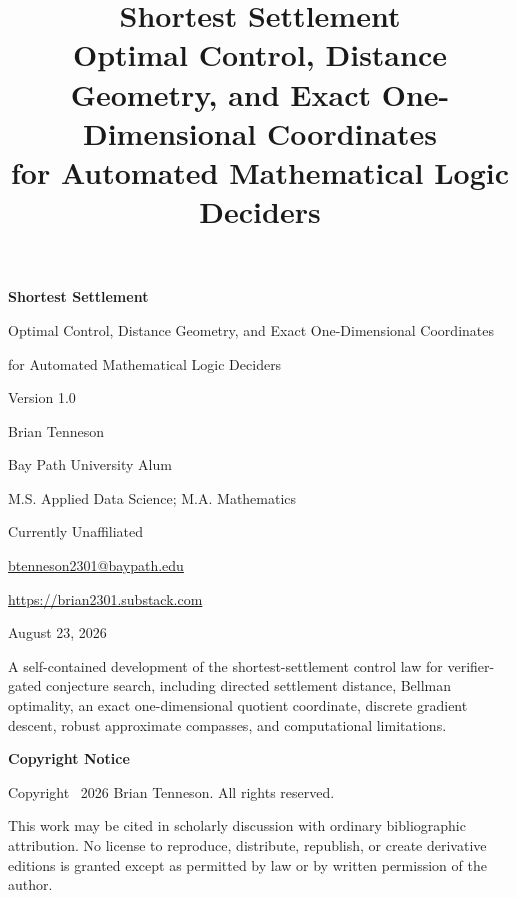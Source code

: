 \documentclass[11pt,letterpaper]{article}
\title{\bfseries Shortest Settlement\\[0.35em]
\Large Optimal Control, Distance Geometry, and Exact One-Dimensional Coordinates\\
for Automated Mathematical Logic Deciders}
\author{}
\date{}
\theoremstyle{remark}
\begin{document}
\begin{titlepage}
\thispagestyle{empty}
\centering
\vspace*{0.85in}
{\LARGE\bfseries Shortest Settlement\par}
\vspace{0.25in}
{\Large Optimal Control, Distance Geometry, and Exact One-Dimensional Coordinates\par}
{\Large for Automated Mathematical Logic Deciders\par}
\vspace{0.55in}
{\large Version 1.0\par}
\vspace{0.45in}
{\Large Brian Tenneson\par}
\vspace{0.12in}
{\normalsize Bay Path University Alum\par}
{\normalsize M.S. Applied Data Science; M.A. Mathematics\par}
{\normalsize Currently Unaffiliated\par}
\vspace{0.14in}
{\normalsize\href{mailto:btenneson2301@baypath.edu}{btenneson2301@baypath.edu}\par}
{\normalsize\url{https://brian2301.substack.com}\par}
\vfill
{\large August 23, 2026\par}
\vspace{0.25in}
\begin{minipage}{0.82\textwidth}
\small
\centering
A self-contained development of the shortest-settlement control law for verifier-gated conjecture search, including directed settlement distance, Bellman optimality, an exact one-dimensional quotient coordinate, discrete gradient descent, robust approximate compasses, and computational limitations.
\end{minipage}
\vspace{0.45in}
\end{titlepage}

\clearpage
\thispagestyle{empty}
\vspace*{1.15in}
\begin{center}
{\large\bfseries Copyright Notice}
\end{center}
\vspace{0.3in}
\noindent Copyright \textcopyright\ 2026 Brian Tenneson. All rights reserved.

\medskip
\noindent This work may be cited in scholarly discussion with ordinary bibliographic attribution. No license to reproduce, distribute, republish, or create derivative editions is granted except as permitted by law or by written permission of the author.
\end{document}
